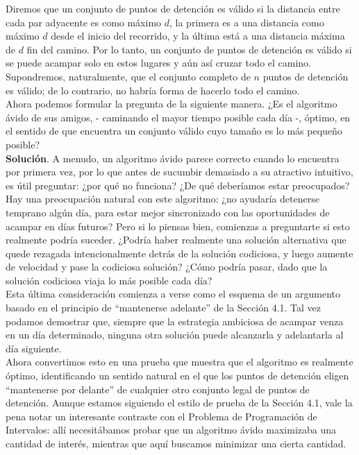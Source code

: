 \documentclass[a4paper, 12pt]{book}
\theoremstyle{dotless}
\begin{document}
Diremos que un conjunto de puntos de detención es válido si la distancia entre cada par adyacente es como máximo $d$, la primera es a una distancia como máximo $d$ desde el inicio del recorrido, y la última está a una distancia máxima de $d$ fin del camino. Por lo tanto, un conjunto de puntos de detención es válido si se puede acampar solo en estos lugares y aún así cruzar todo el camino. Supondremos, naturalmente, que el conjunto completo de $n$ puntos de detención es válido; de lo contrario, no habría forma de hacerlo todo el camino.\\

Ahora podemos formular la pregunta de la siguiente manera. ¿Es el algoritmo ávido de sus amigos, - caminando el mayor tiempo posible cada día -, óptimo, en el sentido de que encuentra un conjunto válido cuyo tamaño es lo más pequeño posible?\\


\textbf{Solución}. A menudo, un algoritmo ávido parece correcto cuando lo encuentra por primera vez, por lo que antes de sucumbir demasiado a su atractivo intuitivo, es útil preguntar: ¿por qué no funciona? ¿De qué deberíamos estar preocupados?\\

Hay una preocupación natural con este algoritmo: ¿no ayudaría detenerse temprano algún día, para estar mejor sincronizado con las oportunidades de acampar en días futuros? Pero si lo piensas bien, comienzas a preguntarte si esto realmente podría suceder. ¿Podría haber realmente una solución alternativa que quede rezagada intencionalmente detrás de la solución codiciosa, y luego aumente de velocidad y pase la codiciosa solución? ¿Cómo podría pasar, dado que la solución codiciosa viaja lo más posible cada día?\\

Esta última consideración comienza a verse como el esquema de un argumento basado en el principio de ``mantenerse adelante'' de la Sección 4.1. Tal vez podamos demostrar que, siempre que la estrategia ambiciosa de acampar venza en un día determinado, ninguna otra solución puede alcanzarla y adelantarla al día siguiente.\\

Ahora convertimos esto en una prueba que muestra que el algoritmo es realmente óptimo, identificando un sentido natural en el que los puntos de detención eligen ``mantenerse por delante'' de cualquier otro conjunto legal de puntos de detención. Aunque estamos siguiendo el estilo de prueba de la Sección 4.1, vale la pena notar un interesante contraste con el Problema de Programación de Intervalos: allí necesitábamos probar que un algoritmo ávido maximizaba una cantidad de interés, mientras que aquí buscamos minimizar una cierta cantidad.\\
\end{document}
